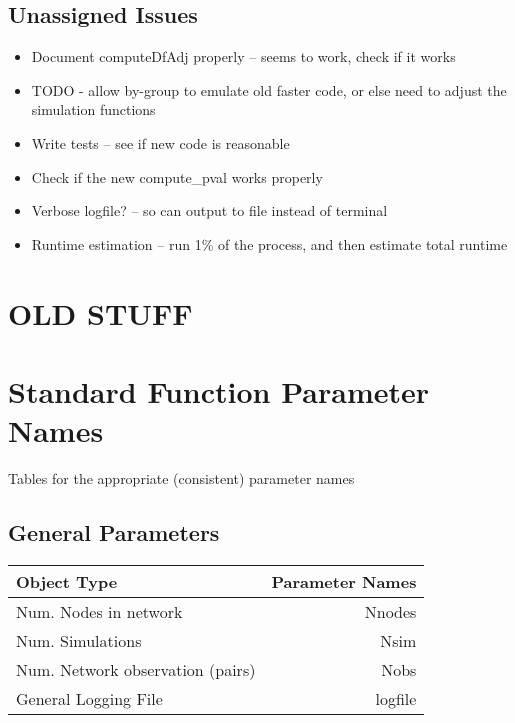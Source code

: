 \documentclass[11pt]{article}
\begin{document}
\subsection{Unassigned Issues}
\begin{itemize}
\item Document computeDfAdj properly -- seems to work, check if it works
\item TODO - allow by-group to emulate old faster code, or else need to adjust the simulation functions
\item Write tests -- see if new code is reasonable
\item Check if the new compute\_pval works properly
\item Verbose logfile? -- so can output to file instead of terminal
\item Runtime estimation -- run 1\% of the process, and then estimate total runtime
\end{itemize}









\pagebreak

\section{OLD STUFF} 
\section{Standard Function Parameter Names}
Tables for the appropriate (consistent) parameter names









\subsection{General Parameters}
\begin{tabular}{|l|r|}
\hline
{\bf Object Type} & {\bf Parameter Names} \\


\hline
Num. Nodes in network & Nnodes \\

\hline
Num. Simulations & Nsim \\

\hline
Num. Network observation (pairs) & Nobs \\

\hline 
General Logging File	 & logfile \\

\hline
\end{tabular}
\end{document}
